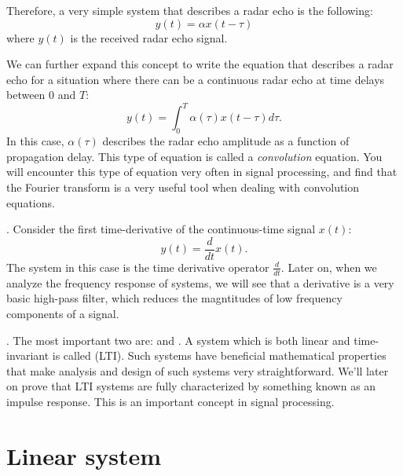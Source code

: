 Therefore, a very simple system that describes a radar echo is the following:
\begin{equation}
   y(t) = \alpha x(t-\tau)
\end{equation}
where $y(t)$ is the received radar echo signal.

We can further expand this concept to write the equation that describes a radar echo 
for a situation where there can be a continuous radar echo at time delays between $0$ and $T$:
\begin{equation}
   y(t) = \int_0^T \alpha(\tau) x(t-\tau) d\tau.
\end{equation}
In this case, $\alpha(\tau)$ describes the radar echo amplitude as a function of propagation delay. 
This type of equation is called a \emph{convolution} equation.
You will encounter this type of equation very often in signal processing, and find that 
the Fourier transform is a very useful tool when dealing with convolution equations.

. Consider the first time-derivative of the continuous-time signal $x(t)$:
\begin{equation}
   y(t) = \frac{d}{d t}x(t).
\end{equation}
The system in this case is the time derivative operator
$\frac{d}{dt}$. Later on, when we analyze the frequency response of
systems, we will see that a derivative is a very basic high-pass
filter, which reduces the magntitudes of low frequency components of a
signal.

. 
The most important two are: \emph{} and \emph{}. A
system which is both linear and time-invariant is called
(LTI). Such systems have beneficial mathematical properties that 
make analysis and design of such systems very straightforward.
We'll later on prove that LTI systems are fully characterized by something 
known as an impulse response. This is an important concept in signal processing.

\section{Linear system}

